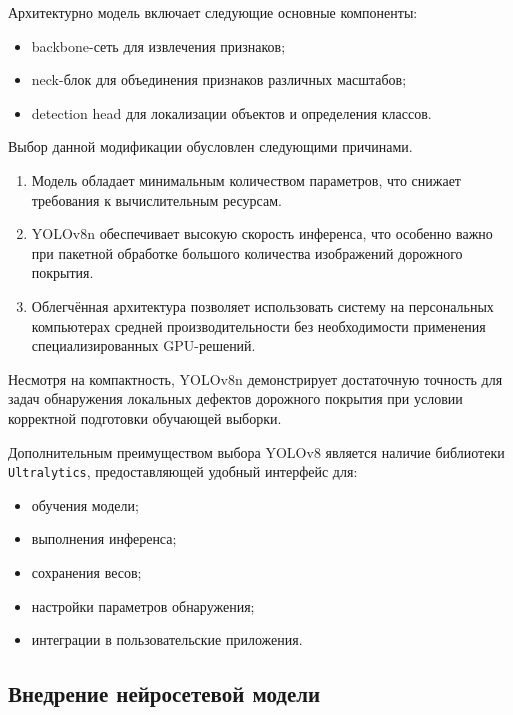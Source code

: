 Архитектурно модель включает следующие основные компоненты:

\begin{itemize}
	\item backbone-сеть для извлечения признаков;
	\item neck-блок для объединения признаков различных масштабов;
	\item detection head для локализации объектов и определения классов.
\end{itemize}

Выбор данной модификации обусловлен следующими причинами.

\begin{enumerate}
	\item Модель обладает минимальным количеством параметров, что снижает требования к вычислительным ресурсам.

	\item YOLOv8n обеспечивает высокую скорость инференса, что особенно важно при пакетной обработке большого количества изображений дорожного покрытия.

	\item Облегчённая архитектура позволяет использовать систему на персональных компьютерах средней производительности без необходимости применения специализированных GPU-решений.
\end{enumerate}

Несмотря на компактность, YOLOv8n демонстрирует достаточную точность для задач обнаружения локальных дефектов дорожного покрытия при условии корректной подготовки обучающей выборки.

Дополнительным преимуществом выбора YOLOv8 является наличие библиотеки \texttt{Ultralytics}, предоставляющей удобный интерфейс для:

\begin{itemize}
	\item обучения модели;
	\item выполнения инференса;
	\item сохранения весов;
	\item настройки параметров обнаружения;
	\item интеграции в пользовательские приложения.
\end{itemize}

\subsection{Внедрение нейросетевой модели}


